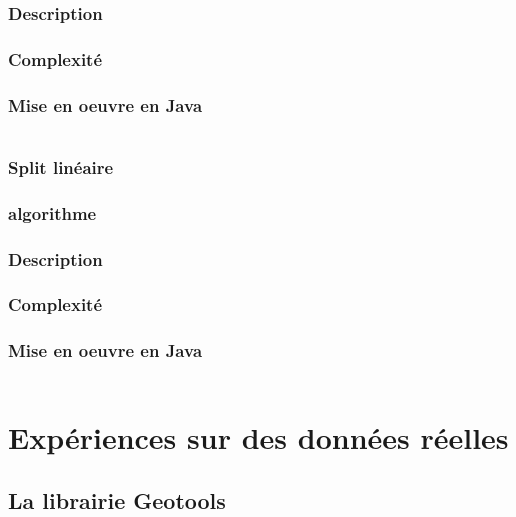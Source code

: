     \subsubsection{Description}

    \subsubsection{Complexité}

    \subsubsection{Mise en oeuvre en Java }

    \begin{lstlisting}[language=java]
    \end{lstlisting}


    \subsubsection{Split linéaire}
    \label{sec:Lineaire_introduction}

    \subsubsection{algorithme}


    \subsubsection{Description}

    \subsubsection{Complexité}

    \subsubsection{Mise en oeuvre en Java }

    \begin{lstlisting}[language=java]
    \end{lstlisting}


    \newpage

    \section{Expériences sur des données réelles }
    \subsection{La librairie Geotools}
